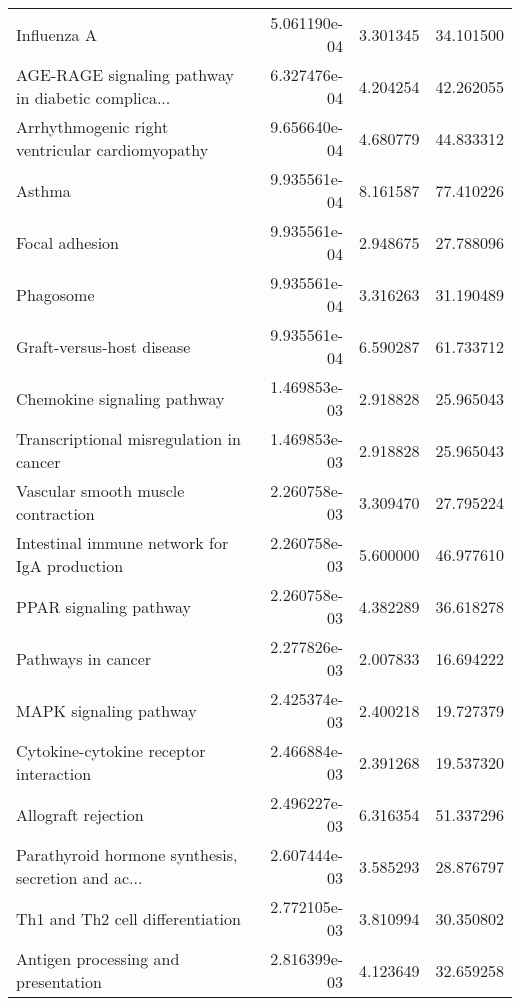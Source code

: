 \begin{tabular}{lrrr}
                                       Influenza A &      5.061190e-04 &  3.301345 &       34.101500 \\
AGE-RAGE signaling pathway in diabetic complica... &      6.327476e-04 &  4.204254 &       42.262055 \\
   Arrhythmogenic right ventricular cardiomyopathy &      9.656640e-04 &  4.680779 &       44.833312 \\
                                            Asthma &      9.935561e-04 &  8.161587 &       77.410226 \\
                                    Focal adhesion &      9.935561e-04 &  2.948675 &       27.788096 \\
                                         Phagosome &      9.935561e-04 &  3.316263 &       31.190489 \\
                         Graft-versus-host disease &      9.935561e-04 &  6.590287 &       61.733712 \\
                       Chemokine signaling pathway &      1.469853e-03 &  2.918828 &       25.965043 \\
           Transcriptional misregulation in cancer &      1.469853e-03 &  2.918828 &       25.965043 \\
                Vascular smooth muscle contraction &      2.260758e-03 &  3.309470 &       27.795224 \\
      Intestinal immune network for IgA production &      2.260758e-03 &  5.600000 &       46.977610 \\
                            PPAR signaling pathway &      2.260758e-03 &  4.382289 &       36.618278 \\
                                Pathways in cancer &      2.277826e-03 &  2.007833 &       16.694222 \\
                            MAPK signaling pathway &      2.425374e-03 &  2.400218 &       19.727379 \\
            Cytokine-cytokine receptor interaction &      2.466884e-03 &  2.391268 &       19.537320 \\
                               Allograft rejection &      2.496227e-03 &  6.316354 &       51.337296 \\
Parathyroid hormone synthesis, secretion and ac... &      2.607444e-03 &  3.585293 &       28.876797 \\
                  Th1 and Th2 cell differentiation &      2.772105e-03 &  3.810994 &       30.350802 \\
               Antigen processing and presentation &      2.816399e-03 &  4.123649 &       32.659258 \\

\end{tabular}
